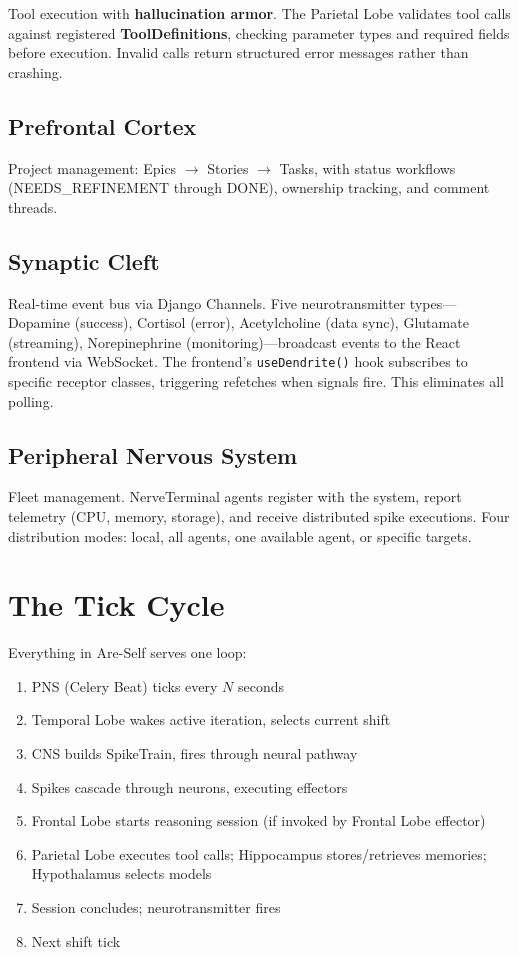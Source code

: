 \documentclass[man,12pt,floatsintext]{apa7}
\begin{document}
Tool execution with \textbf{hallucination armor}. The Parietal Lobe validates tool calls
against registered \textbf{ToolDefinitions}, checking parameter types and required fields
before execution. Invalid calls return structured error messages rather than crashing.

\subsection{Prefrontal Cortex}

Project management: Epics $\rightarrow$ Stories $\rightarrow$ Tasks, with status
workflows (NEEDS\_REFINEMENT through DONE), ownership tracking, and comment threads.

\subsection{Synaptic Cleft}

Real-time event bus via Django Channels. Five neurotransmitter types---Dopamine (success),
Cortisol (error), Acetylcholine (data sync), Glutamate (streaming), Norepinephrine
(monitoring)---broadcast events to the React frontend via WebSocket. The frontend's
\texttt{useDendrite()} hook subscribes to specific receptor classes, triggering refetches
when signals fire. This eliminates all polling.

\subsection{Peripheral Nervous System}

Fleet management. NerveTerminal agents register with the system, report telemetry
(CPU, memory, storage), and receive distributed spike executions. Four distribution modes:
local, all agents, one available agent, or specific targets.

\section{The Tick Cycle}
\label{sec:execution}

Everything in Are-Self serves one loop:

\begin{enumerate}
  \item PNS (Celery Beat) ticks every $N$ seconds
  \item Temporal Lobe wakes active iteration, selects current shift
  \item CNS builds SpikeTrain, fires through neural pathway
  \item Spikes cascade through neurons, executing effectors
  \item Frontal Lobe starts reasoning session (if invoked by Frontal Lobe effector)
  \item Parietal Lobe executes tool calls; Hippocampus stores/retrieves memories;
        Hypothalamus selects models
  \item Session concludes; neurotransmitter fires
  \item Next shift tick
\end{enumerate}
\end{document}
